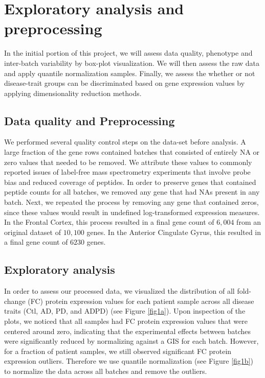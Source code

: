 \section{Exploratory analysis and preprocessing}
\label{sec:expl-analys-prepr}

 In the initial portion of this project, we will assess data quality, phenotype and  inter-batch variability by box-plot visualization. We will then assess the raw data and apply quantile normalization samples. Finally, we assess the whether or not disease-trait groups can be discriminated based on gene expression values by applying dimensionality reduction methods. 


\subsection{Data quality and Preprocessing}
\label{subsec:data-qual-vari}

We performed several quality control steps on the data-set before analysis. A large fraction of the gene rows contained batches that consisted of entirely NA or zero values that needed to be removed. We attribute these values to commonly reported issues of label-free mass spectrometry experiments that involve probe bias and reduced coverage of peptides. In order to preserve genes that contained peptide counts for all batches, we removed any gene that had NAs present in any batch. Next, we repeated the process by removing any gene that contained zeros, since these values would result in undefined log-transformed expression measures. In the Frontal Cortex, this process resulted in a final gene count of $6,004$ from an original dataset of $10,100$ genes. In the Anterior Cingulate Gyrus, this resulted in a final gene count of $6230$ genes. 

\subsection{Exploratory analysis}
\label{subsec:exploratory-analysis}


In order to assess our processed data, we visualized the distribution of all fold-change (FC) protein expression values for each patient sample across all disease traits (Ctl, AD, PD, and ADPD) (see Figure \ref{fig1a}). Upon inspection of the plots, we noticed that all samples had FC protein expression values that were centered around zero, indicating that the experimental effects between batches were significantly reduced by normalizing against a GIS for each batch. However, for a fraction of patient samples, we still observed significant FC protein expression outliers. Therefore we use quantile normalization (see Figure \ref{fig1b}) to normalize the data across all batches and remove the outliers.\\

